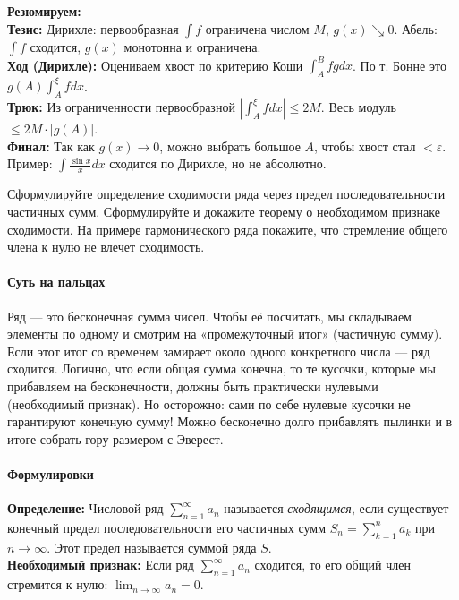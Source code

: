 \begin{tcolorbox}[colback=gray!5, colframe=black, boxrule=0.5pt, arc=0pt]
\textbf{Резюмируем:} \\
\textbf{Тезис:} Дирихле: первообразная $\int f$ ограничена числом $M$, $g(x) \searrow 0$. Абель: $\int f$ сходится, $g(x)$ монотонна и ограничена. \\
\textbf{Ход (Дирихле):} Оцениваем хвост по критерию Коши $\int_A^B fg dx$. По т. Бонне это $g(A) \int_A^\xi f dx$. \\
\textbf{Трюк:} Из ограниченности первообразной $\left| \int_A^\xi f dx \right| \le 2M$. Весь модуль $\le 2M \cdot |g(A)|$. \\
\textbf{Финал:} Так как $g(x) \to 0$, можно выбрать большое $A$, чтобы хвост стал $< \varepsilon$. Пример: $\int \frac{\sin x}{x} dx$ сходится по Дирихле, но не абсолютно.
\end{tcolorbox}

{Сформулируйте определение сходимости ряда через предел последовательности частичных сумм. Сформулируйте и докажите теорему о необходимом признаке сходимости. На примере гармонического ряда покажите, что стремление общего члена к нулю не влечет сходимость.}

\paragraph{Суть на пальцах}
Ряд — это бесконечная сумма чисел. Чтобы её посчитать, мы складываем элементы по одному и смотрим на «промежуточный итог» (частичную сумму). Если этот итог со временем замирает около одного конкретного числа — ряд сходится. 
Логично, что если общая сумма конечна, то те кусочки, которые мы прибавляем на бесконечности, должны быть практически нулевыми (необходимый признак). Но осторожно: сами по себе нулевые кусочки не гарантируют конечную сумму! Можно бесконечно долго прибавлять пылинки и в итоге собрать гору размером с Эверест.

\paragraph{Формулировки}
\textbf{Определение:} Числовой ряд $\sum_{n=1}^\infty a_n$ называется \textit{сходящимся}, если существует конечный предел последовательности его частичных сумм $S_n = \sum_{k=1}^n a_k$ при $n \to \infty$. Этот предел называется суммой ряда $S$. \\
\textbf{Необходимый признак:} Если ряд $\sum_{n=1}^\infty a_n$ сходится, то его общий член стремится к нулю: $\lim_{n \to \infty} a_n = 0$.


